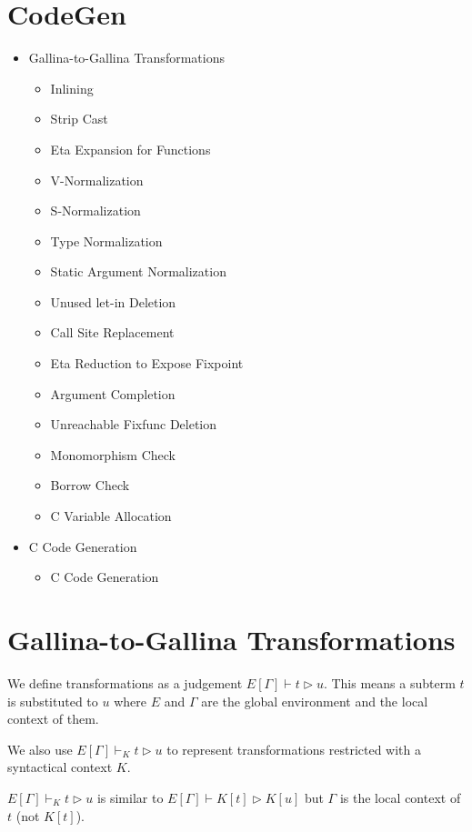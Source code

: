 \documentclass[a4paper,fleqn]{article}
\def\gallina{\textrm{Gallina}}
\newcommand{\reltri}{\mathrel{\triangleright}}
\begin{document}
\section{CodeGen}\label{sec:codegen}

\begin{itemize}
\item \gallina-to-\gallina{} Transformations
  \begin{itemize}
  \item Inlining
  \item Strip Cast
  \item Eta Expansion for Functions
  \item V-Normalization
  \item S-Normalization
  \item Type Normalization
  \item Static Argument Normalization
  \item Unused let-in Deletion
  \item Call Site Replacement
  \item Eta Reduction to Expose Fixpoint
  \item Argument Completion
  \item Unreachable Fixfunc Deletion
  \item Monomorphism Check
  \item Borrow Check
  \item C Variable Allocation
  \end{itemize}
\item C Code Generation
  \begin{itemize}
  \item C Code Generation
  \end{itemize}
\end{itemize}

\section{\gallina-to-\gallina{} Transformations}\label{sec:gallina-to-gallina-transformations}

We define transformations as a judgement $E[\Gamma] \vdash t \reltri u$.
This means a subterm $t$ is substituted to $u$ where
$E$ and $\Gamma$ are the global environment and the local context of them.

We also use $E[\Gamma] \vdash_K t \reltri u$ to represent transformations restricted with a syntactical context $K$.

$E[\Gamma] \vdash_K t \reltri u$ is similar to $E[\Gamma] \vdash K[t] \reltri K[u]$ but
$\Gamma$ is the local context of $t$ (not $K[t]$).
\end{document}
